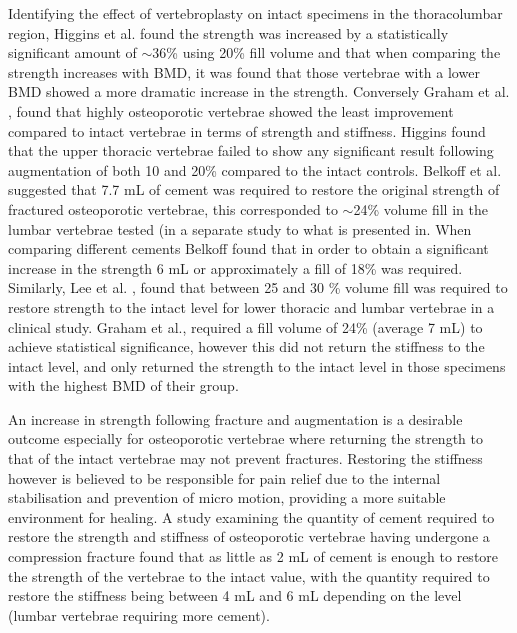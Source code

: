 Identifying the effect of vertebroplasty on intact specimens in the
thoracolumbar region, Higgins et al. \cite{Higgins2007a} found the strength was
increased by a statistically significant amount of $\sim$36\% using 20\% fill volume
and that when comparing the strength increases with BMD, it was found
that those vertebrae with a lower BMD showed a more dramatic increase in
the strength. Conversely Graham et al. \cite{Graham2003}, found that highly osteoporotic
vertebrae showed the least improvement compared to intact vertebrae in
terms of strength and stiffness. Higgins found that the upper thoracic
vertebrae failed to show any significant result following augmentation
of both 10 and 20\% compared to the intact controls. Belkoff et al.
\cite{belkoff2000vertebroplasty} suggested that 7.7 mL of cement was required
to restore the
original strength of fractured osteoporotic vertebrae, this corresponded
to $\sim$24\% volume fill in the lumbar vertebrae tested (in a separate study
to what is presented in. When comparing different cements Belkoff
\cite{belkoff2000biomechanical} found that in order to obtain a significant
increase in the
strength 6 mL or approximately a fill of 18\% was required. Similarly,
Lee et al. \cite{lee2002prediction}, found that between 25 and 30 \% volume
fill was
required to restore strength to the intact level for lower thoracic and
lumbar vertebrae in a clinical study. Graham et al.\cite{Graham2003}, required a fill
volume of 24\% (average 7 mL) to achieve statistical significance,
however this did not return the stiffness to the intact level, and only
returned the strength to the intact level in those specimens with the
highest BMD of their group.

An increase in strength following fracture and augmentation is a
desirable outcome especially for osteoporotic vertebrae where
returning the strength to that of the intact vertebrae may not prevent
fractures. Restoring the stiffness however is believed to be responsible
for pain relief due to the internal stabilisation and prevention of
micro motion, providing a more suitable environment for healing. A study
examining the quantity of cement required to restore the strength and
stiffness of osteoporotic vertebrae having undergone a compression
fracture found that as little as 2 mL of cement is enough to restore the
strength of the vertebrae to the intact value, with the quantity
required to restore the stiffness being between 4 mL and 6 mL depending
on the level (lumbar vertebrae requiring more
cement)\cite{belkoff2001biomechanics}.

